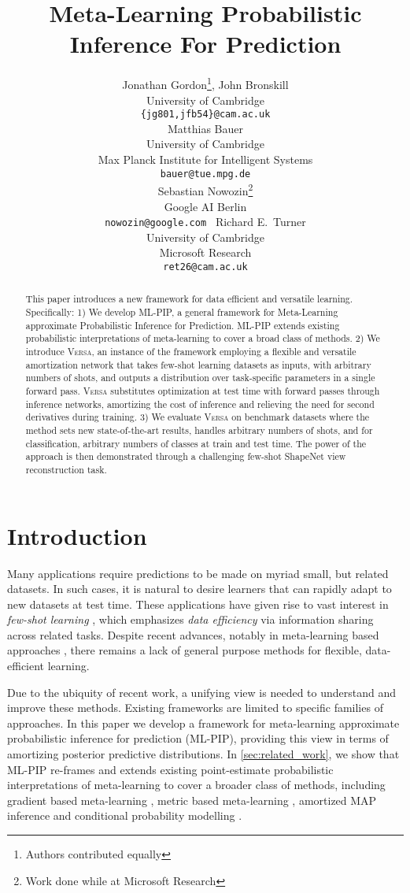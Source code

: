 \documentclass{article}
\title{Meta-Learning Probabilistic Inference For Prediction}
\author{Jonathan Gordon\thanks{Authors contributed equally}, John Bronskill\footnotemark[1]\\
University of Cambridge\\
\texttt{\{jg801,jfb54\}@cam.ac.uk} \\
\And
Matthias Bauer \\
University of Cambridge\\
Max Planck Institute for Intelligent Systems\\
\texttt{bauer@tue.mpg.de} \\
\AND
Sebastian Nowozin\thanks{Work done while at Microsoft Research}\\
Google AI Berlin\\
\texttt{nowozin@google.com }
\And
Richard E.~Turner\\
University of Cambridge\\
Microsoft Research\\
\texttt{ret26@cam.ac.uk}
}
\newcommand{\Versa}{\textsc{Versa}}
\begin{document}
\maketitle

\begin{abstract}
This paper introduces a new framework for data efficient and versatile learning. Specifically:
1) We develop ML-PIP, a general framework for Meta-Learning approximate Probabilistic Inference for Prediction. ML-PIP extends existing probabilistic interpretations of meta-learning to cover a broad class of methods. 
2) We introduce \Versa{}, an instance of the framework employing a flexible and versatile amortization network that takes few-shot learning datasets as inputs, with arbitrary numbers of shots, and outputs a distribution over task-specific parameters in a single forward pass. \Versa{} substitutes optimization at test time with forward passes through inference networks, amortizing the cost of inference and relieving the need for second derivatives during training.
3) We evaluate \Versa{} on benchmark datasets where the method sets new state-of-the-art results, handles arbitrary numbers of shots, and for classification, arbitrary numbers of classes at train and test time. The power of the approach is then demonstrated through a challenging few-shot ShapeNet view reconstruction task. 
\end{abstract}

\section{Introduction}
\label{sec:intro}

Many applications require predictions to be made on myriad small, but related datasets. In such cases, it is natural to desire learners that can rapidly adapt to new datasets at test time. These applications have given rise to vast interest in \textit{few-shot learning} \citep{fei2006one, lake2011one}, which emphasizes \textit{data efficiency} via information sharing across related tasks. Despite recent advances, notably in meta-learning based approaches \citep{ravi2016optimization,vinyals2016matching,edwards2016towards,finn2017model,lacoste2018uncertainty}, there remains a lack of general purpose methods for flexible, data-efficient learning.


Due to the ubiquity of recent work, a unifying view is needed to understand and improve these methods. Existing frameworks \citep{grant2018recasting,finn2018probabilistic} are limited to specific families of approaches. In this paper we develop a framework for meta-learning approximate probabilistic inference for prediction (ML-PIP), providing this view in terms of amortizing posterior predictive distributions. In \cref{sec:related_work}, we show that ML-PIP re-frames and extends existing point-estimate probabilistic interpretations of meta-learning \citep{grant2018recasting, finn2018probabilistic} to cover a broader class of methods, including gradient based meta-learning \citep{finn2017model,ravi2016optimization}, metric based meta-learning \citep{snell2017prototypical}, amortized MAP inference \citep{qiao2017few} and conditional probability modelling \citep{garnelo2018conditional, garnelo2018neural}.
\end{document}
